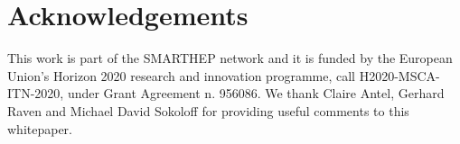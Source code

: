 \documentclass{smarthepnote}
\begin{document}
\begin{abstract}
\vspace{-0.25cm}
\end{abstract}

\vspace{-0.25cm} %
\makereviewtable
\clearpage

\begingroup
\color{black}
\endgroup
\pagebreak












\clearpage
\section*{Acknowledgements}
This work is part of the SMARTHEP network and it is funded by the European Union’s Horizon 2020 research and innovation programme, call H2020-MSCA-ITN-2020, under Grant Agreement n. 956086. 
We thank Claire Antel, Gerhard Raven and Michael David Sokoloff for providing useful comments to this whitepaper.



\end{document}
